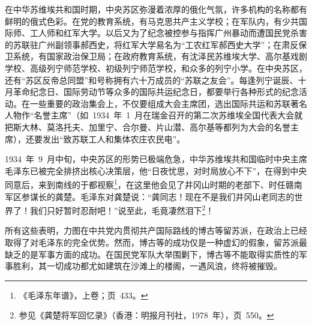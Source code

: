 在中华苏维埃共和国时期，中央苏区弥漫着浓厚的俄化气氛，许多机构的名称都有鲜明的俄式色彩。在党的教育系统，有马克思共产主义学校；在军队内，有少共国际师、工人师和红军大学。以后又为了纪念被控参与指挥广州暴动而遭国民党杀害的苏联驻广州副领事郝西史，将红军大学易名为“工农红军郝西史大学”；在肃反保卫系统，有国家政治保卫局；在政府教育系统，有沈泽民苏维埃大学、高尔基戏剧学校、高级列宁师范学校、初级列宁师范学校，和众多的列宁小学。在中央苏区，还有“苏区反帝总同盟”和号称拥有六十万成员的“苏联之友会”。每逢列宁诞辰、十月革命纪念日、国际劳动节等众多的国际共运纪念日，都要举行各种形式的纪念活动。在一些重要的政治集会上，不仅要组成大会主席团，选出国际共运和苏联著名人物作“名誉主席”（如~1934~年~1~月在瑞金召开的第二次苏维埃全国代表大会就把斯大林、莫洛托夫、加里宁、合尔曼、片山潜、高尔基等都列为大会的名誉主席），还要发出“致苏联工人和集体农庄农民电”。

1934~年~9~月中旬，中央苏区的形势已极端危急，中华苏维埃共和国临时中央主席毛泽东已被完全排挤出核心决策层，他“日夜忧思，对时局放心不下”，在得到中央同意后，来到南线的于都视察\footnote{《毛泽东年谱》，上卷；页~433。}，在这里他会见了井冈山时期的老部下、时任赣南军区参谋长的龚楚。毛泽东对龚楚说：“龚同志！现在不是我们井冈山老同志的世界了！我们只好暂时忍耐吧！”说至此，毛竟凄然泪下\footnote{参见《龚楚将军回忆录》（香港：明报月刊社，1978~年），页~550。}！

所有这些表明，力图在中共党内贯彻共产国际路线的博古等留苏派，在政治上已经取得了对毛泽东的完全优势。然而，博古等的成功仅是一种虚幻的假象，留苏派最缺乏的是军事方面的成功。在国民党军队大举围剿下，博古等不能取得实质性的军事胜利，其一切成功都尤如建筑在沙滩上的楼阁，一遇风浪，终将被摧毁。
